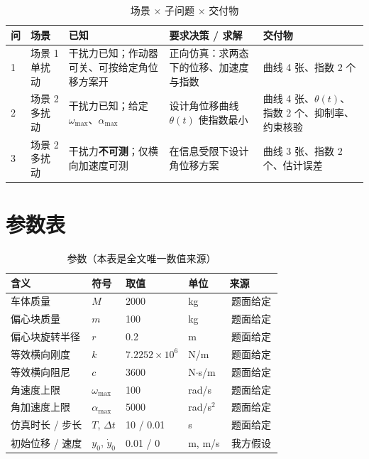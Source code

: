 \documentclass[a4paper,11pt]{ctexart}
\newcommand{\src}[1]{{\footnotesize\colorbox{black!8}{\,#1\,}}}
\newcommand{\given}{\src{题面给定}}
\newcommand{\assumed}{\src{我方假设}}
\begin{document}
\begin{table}[htbp]\centering\small
  \caption{场景 × 子问题 × 交付物}
  \begin{tabular}{@{}C{0.06\textwidth}L{0.20\textwidth}L{0.24\textwidth}L{0.26\textwidth}L{0.14\textwidth}@{}}
    \toprule
    问 & 场景 & 已知 & 要求决策 / 求解 & 交付物 \\
     & 场景 1 单扰动 & 干扰力已知；作动器可关、可按给定角位移方案开 &
      正向仿真：求两态下的位移、加速度与指数 & 曲线 4 张、指数 2 个 \\
    2 & 场景 2 多扰动 & 干扰力已知；给定 $\omega_{\max}$、$\alpha_{\max}$ &
      设计角位移曲线 $\theta(t)$ 使指数最小 & 曲线 4 张、$\theta(t)$、
      指数 2 个、抑制率、约束核验 \\
    3 & 场景 2 多扰动 & 干扰力\textbf{不可测}；仅横向加速度可测 &
      在信息受限下设计角位移方案 & 曲线 3 张、指数 2 个、估计误差 \\
    \bottomrule
  \end{tabular}
\end{table}

\section{参数表}

\begin{table}[htbp]\centering\small
  \caption{参数（本表是全文唯一数值来源）}
  \begin{tabular}{@{}L{0.26\textwidth}C{0.10\textwidth}C{0.16\textwidth}C{0.13\textwidth}L{0.16\textwidth}@{}}
    \toprule
    含义 & 符号 & 取值 & 单位 & 来源 \\
    \midrule
    车体质量 & $M$ & 2000 & kg & \given \\
    偏心块质量 & $m$ & 100 & kg & \given \\
    偏心块旋转半径 & $r$ & 0.2 & m & \given \\
    等效横向刚度 & $k$ & $7.2252\times10^{6}$ & N/m & \given \\
    等效横向阻尼 & $c$ & 3600 & N$\cdot$s/m & \given \\
    角速度上限 & $\omega_{\max}$ & 100 & rad/s & \given \\
    角加速度上限 & $\alpha_{\max}$ & 5000 & rad/s$^2$ & \given \\
    仿真时长 / 步长 & $T$, $\Delta t$ & 10 / 0.01 & s & \given \\
    初始位移 / 速度 & $y_0$, $\dot y_0$ & 0.01 / 0 & m, m/s & \assumed \\
    \bottomrule
  \end{tabular}
\end{table}
\end{document}
